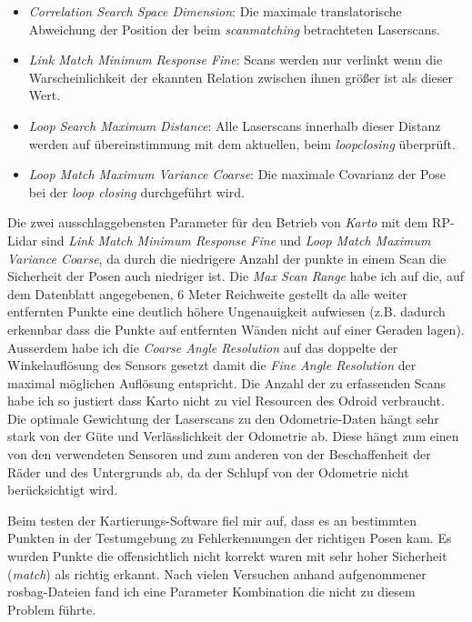 \begin{itemize}
\item \emph{Correlation Search Space Dimension}: Die maximale translatorische Abweichung der Position der beim \emph{scanmatching} betrachteten Laserscans.

\item \emph{Link Match Minimum Response Fine}: Scans werden nur verlinkt wenn die Warscheinlichkeit der ekannten Relation zwischen ihnen größer ist als dieser Wert.

\item \emph{Loop Search Maximum Distance}: Alle Laserscans innerhalb dieser Distanz werden auf übereinstimmung mit dem aktuellen, beim \emph{loopclosing} überprüft.

\item \emph{Loop Match Maximum Variance Coarse}: Die maximale Covarianz der Pose bei der \emph{loop closing} durchgeführt wird.
\end{itemize}

Die zwei ausschlaggebensten Parameter für den Betrieb von \emph{Karto} mit dem RP-Lidar sind \emph{Link Match Minimum Response Fine} und \emph{Loop Match Maximum Variance Coarse}, da durch die niedrigere Anzahl der punkte in einem Scan die Sicherheit der Posen auch niedriger ist. 
Die \emph{Max Scan Range} habe ich auf die, auf dem Datenblatt angegebenen, 6 Meter Reichweite gestellt da alle weiter entfernten Punkte eine deutlich höhere Ungenauigkeit aufwiesen (z.B. dadurch erkennbar dass die Punkte auf entfernten Wänden nicht auf einer Geraden lagen).
Ausserdem habe ich die \emph{Coarse Angle Resolution} auf das doppelte der Winkelauflösung des Sensors gesetzt damit die \emph{Fine Angle Resolution} der maximal möglichen Auflösung entspricht.
Die Anzahl der zu erfassenden Scans habe ich so justiert dass Karto nicht zu viel Resourcen des Odroid verbraucht.
Die optimale Gewichtung der Laserscans zu den Odometrie-Daten hängt sehr stark von der Güte und Verlässlichkeit der Odometrie ab. Diese hängt zum einen von den verwendeten Sensoren und zum anderen von der Beschaffenheit der Räder und des Untergrunds ab, da der Schlupf von der Odometrie nicht berücksichtigt wird.

Beim testen der Kartierungs-Software fiel mir auf, dass es an bestimmten Punkten in der Testumgebung zu Fehlerkennungen der richtigen Posen kam. Es wurden Punkte die offensichtlich nicht korrekt waren mit sehr hoher Sicherheit (\emph{match}) als richtig erkannt. Nach vielen Versuchen anhand aufgenommener \Gls{rosbag}-Dateien fand ich eine Parameter Kombination die nicht zu diesem Problem führte.

